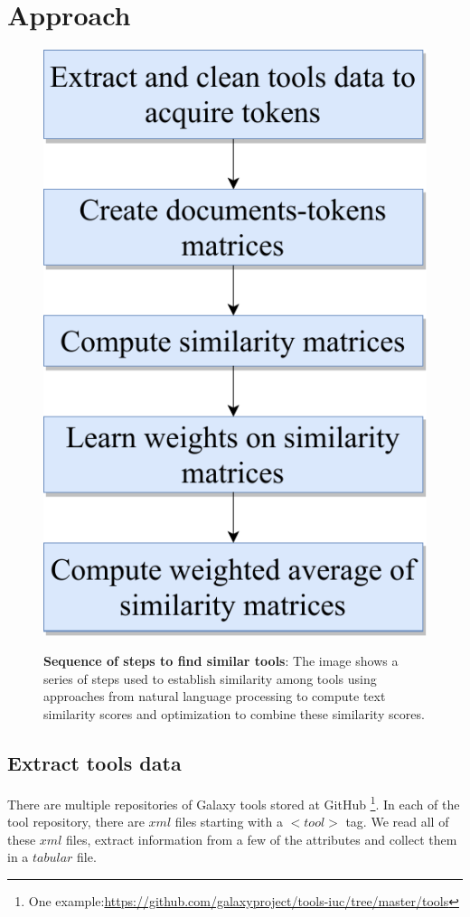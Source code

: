 \chapter{Approach}\label{chap:approach}

\begin{figure}[h]
\begin{centering}
    {\includegraphics[scale=0.7]{figures/tool_sim_flow.pdf}}
    \caption[Tool similarity flowchart]{\textbf{Sequence of steps to find similar tools}: The image shows a series of steps used to establish similarity among tools using approaches from natural language processing to compute text similarity scores and optimization to combine these similarity scores.}
\end{centering}
\end{figure}

\section{Extract tools data}    
There are multiple repositories of Galaxy tools stored at GitHub \footnote{One example:\url{https://github.com/galaxyproject/tools-iuc/tree/master/tools}}. In each of the tool repository, there are $xml$ files starting with a $<tool>$ tag. We read all of these $xml$ files, extract information from a few of the attributes and collect them in a $tabular$ file.
    
